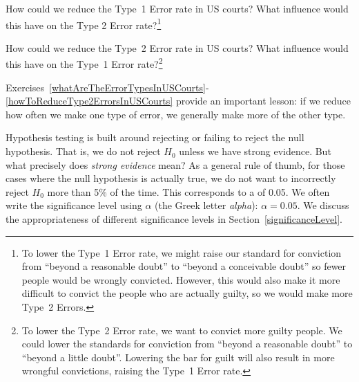 \begin{exercise} \label{howToReduceType1ErrorsInUSCourts}
How could we reduce the Type~1 Error rate in US courts? What influence would this have on the Type 2 Error rate?\footnote{To lower the Type~1 Error rate, we might raise our standard for conviction from ``beyond a reasonable doubt'' to ``beyond a conceivable doubt'' so fewer people would be wrongly convicted. However, this would also make it more difficult to convict the people who are actually guilty, so we would make more Type~2 Errors.}
\end{exercise}

\begin{exercise} \label{howToReduceType2ErrorsInUSCourts}
How could we reduce the Type~2 Error rate in US courts? What influence would this have on the Type~1 Error rate?\footnote{To lower the Type~2 Error rate, we want to convict more guilty people. We could lower the standards for conviction from ``beyond a reasonable doubt'' to ``beyond a little doubt''. Lowering the bar for guilt will also result in more wrongful convictions, raising the Type~1 Error rate.}
\end{exercise}


Exercises~\ref{whatAreTheErrorTypesInUSCourts}-\ref{howToReduceType2ErrorsInUSCourts} provide an important lesson: if we reduce how often we make one type of error, we generally make more of the other type.

Hypothesis testing is built around rejecting or failing to reject the null hypothesis. That is, we do not reject $H_0$ unless we have strong evidence. But what precisely does \emph{strong evidence} mean? As a general rule of thumb, for those cases where the null hypothesis is actually true, we do not want to incorrectly reject $H_0$ more than 5\% of the time. This corresponds to a  of 0.05. We often write the significance level using $\alpha$ (the Greek letter \emph{alpha}): $\alpha = 0.05$. We discuss the appropriateness of different significance levels in Section~\ref{significanceLevel}.

